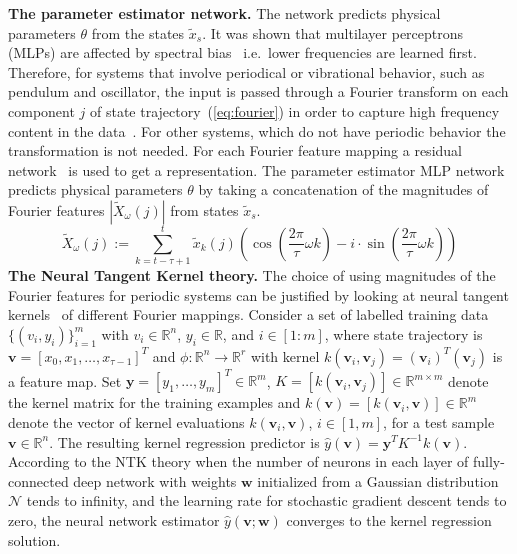 \documentclass[acmtog]{techreportacmart}
\begin{document}
\textbf{The parameter estimator network.} 
The network predicts physical parameters ${\theta}$  from the states $\tilde{x}_{s}$. It was shown that multilayer perceptrons (MLPs) are affected by spectral bias~\cite{rahamanspectral} i.e.~lower frequencies are learned first. Therefore, for systems that involve periodical or vibrational behavior, such as pendulum and oscillator, the input is passed through a Fourier transform on each component ${j}$ of state trajectory~(\ref{eq:fourier}) in order to capture high frequency content in the data~\cite{tancik2020ffn}. For other systems, which do not have periodic behavior the transformation is not needed. For each Fourier feature mapping a residual network~\cite{7780459} is used to get a representation. The parameter estimator MLP network predicts physical parameters ${\theta}$ by taking a concatenation of the magnitudes of Fourier features ${|\tilde{X}_{\omega}(j)|}$ from states $\tilde{x}_{s}$.
\begin{equation}
  \label{eq:fourier}
  \tilde{X}_{\omega}(j) := \sum_{k=t-\tau+1}^{t} \tilde{x}_k(j) \left( \cos \left(\frac{2\pi}{\tau} \omega k \right) - i \cdot \sin \left(\frac{2\pi}{\tau} \omega k \right) \right)
\end{equation}
\textbf{The Neural Tangent Kernel theory.} The choice of using magnitudes of the Fourier features for periodic systems can be justified by looking at neural tangent kernels~\cite{NEURIPS2018_5a4be1fa} of different Fourier mappings. Consider a set of labelled training data $\{(v_i, y_i)\}_{i=1}^{m}$ with $v_i \in \mathbb{R}^n$, $y_i \in \mathbb{R}$, and $i \in [1 : m]$, where state trajectory is ${\mathbf{v} = [x_0, x_1, \ldots, x_{\tau-1}]^T}$ and ${\phi: \mathbb{R}^n \rightarrow \mathbb{R}^r}$ with kernel ${k(\mathbf{v}_i, \mathbf{v}_j) = (\mathbf{v}_i)^T (\mathbf{v}_j)}$ is a feature map. Set $\mathbf{y} = [y_1, \ldots, y_m]^T \in \mathbb{R}^m$, $K = [k(\mathbf{v}_i, \mathbf{v}_j)] \in \mathbb{R}^{m \times m}$ denote the kernel matrix for the training examples and $k(\mathbf{v}) = [k(\mathbf{v}_i, \mathbf{v})] \in \mathbb{R}^{m}$ denote the vector of kernel evaluations $k(\mathbf{v}_i, \mathbf{v})$, $i \in [1, m]$, for a test sample $\mathbf{v} \in \mathbb{R}^n$. The resulting kernel regression predictor is $\hat{y}(\mathbf{v}) = \mathbf{y}^T K^{-1} k(\mathbf{v})$.
According to the NTK theory when the number of neurons in each layer of fully-connected deep network with weights ${\mathbf{w}}$ initialized from a Gaussian distribution ${\mathcal{N}}$ tends to infinity, and the learning rate for stochastic gradient descent tends to zero, the neural network estimator ${\hat{y}(\mathbf{v};\mathbf{w})}$ converges to the kernel regression solution. 
\end{document}
